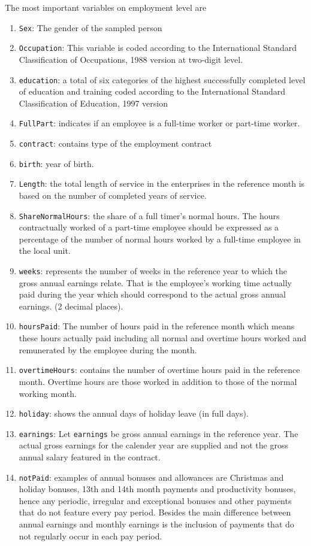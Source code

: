 \documentclass[12pt]{scrartcl}\usepackage[]{graphicx}\usepackage[]{color}
\begin{document}
\noindent The most important variables on employment level are
\begin{enumerate}
\item \texttt{Sex}: The gender of the sampled person
\item \texttt{Occupation}: This variable is coded according to the International Standard Classification of Occupations, 1988 version at two-digit level.
\item \texttt {education}: a total of six categories of the highest
successfully completed level of education and training coded according to the International Standard Classification of Education, 1997 version
\item \texttt{FullPart}: indicates if an employee is a full-time worker or part-time worker.
\item \texttt{contract}: contains type of the employment contract
\item \texttt{birth}: year of birth.
\item  \texttt{Length}: the total length of service in the enterprises in the reference month is based on the number of completed years of service.
\item  \texttt{ShareNormalHours}: the share of a full timer's normal hours. The hours contractually worked of a part-time employee should be expressed as a percentage of the number of  normal hours worked by a full-time employee in the local unit.
\item \texttt{weeks}: represents the number of weeks in the reference year to which the gross annual earnings relate. That is the employee's working time actually paid during the year which should correspond to the actual gross annual earnings. (2 decimal places).
\item \texttt{hoursPaid}: The number of hours paid in the reference month which means these hours actually paid including all normal and overtime hours worked and remunerated by the employee during the month.
\item \texttt{overtimeHours}: contains the number of overtime hours paid in the reference month. Overtime hours are those worked in addition to those of the normal working month.
\item \texttt{holiday}: shows the annual days of holiday leave (in full days).
\item \texttt{earnings}: Let \texttt{earnings} be gross annual earnings in the reference year. The actual gross earnings for the calender year are supplied and not the gross annual salary featured in the contract.
\item \texttt{notPaid}: examples of annual bonuses and allowances are Christmas and holiday bonuses, 13th and 14th month payments and productivity bonuses, hence any periodic, irregular and exceptional bonuses and other payments that do not feature every pay period. Besides the main difference between annual earnings and monthly earnings is the inclusion of payments that do not regularly occur in each pay period.

\end{enumerate}
\end{document}
